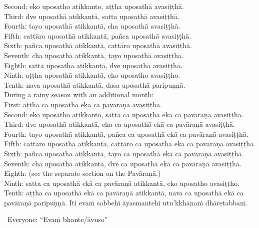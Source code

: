{{{{{					Second: eko uposatho atikkanto, aṭṭha uposathā avasiṭṭhā.\\
					Third: dve uposathā atikkantā, satta uposathā avasiṭṭhā.\\
					Fourth: tayo uposathā atikkantā, cha uposathā avasiṭṭhā.\\
					Fifth: cattāro uposathā atikkantā, pañca uposathā avasiṭṭhā.\\
					Sixth: pañca uposathā atikkantā, cattāro uposathā avasiṭṭhā.\\
					Seventh: cha uposathā atikkantā, tayo uposathā avasiṭṭhā.\\
					Eighth: satta uposathā atikkantā, dve uposathā avasiṭṭhā.\\
					Ninth: aṭṭha uposathā atikkantā, eko uposatho avasiṭṭho.\\
					\smallskip
					Tenth: nava uposathā atikkantā, dasa uposathā paripuṇṇā.\\
					During a rainy season with an additional month:\\
					First: aṭṭha ca uposathā ekā ca pavāraṇā avasiṭṭhā.\\
					Second: eko uposatho atikkanto, satta ca uposathā ekā ca pavāraṇā avasiṭṭhā.\\
					Third: dve uposathā atikkantā, cha ca uposathā ekā ca pavāraṇā avasiṭṭhā.\\
					Fourth: tayo uposathā atikkantā, pañca ca uposathā ekā ca pavāraṇā avasiṭṭhā.\\
					Fifth: cattāro uposathā atikkantā, cattāro ca uposathā ekā ca pavāraṇā avasiṭṭhā.\\
					Sixth: pañca uposathā atikkantā, tayo ca uposathā ekā ca pavāraṇā avasiṭṭhā.\\
					Seventh: cha uposathā atikkantā, dve ca uposathā ekā ca pavāraṇā avasiṭṭhā.\\
					Eighth: (see the separate section on the Pavāraṇā.)\\
					Ninth: satta ca uposathā ekā ca pavāraṇā atikkantā, eko uposatho avasiṭṭho.\\
					Tenth: aṭṭha ca uposathā ekā ca pavāraṇā atikkantā, nava ca uposathā ekā ca pavāraṇā paripuṇṇā.}}}}}\makeatother \thickspace
Iti evaṁ sabbehi āyasmantehi utu'kkhānaṁ dhāretabbaṁ.

\begin{center}
	\anglebracketleft\ \hspace{-0.5mm}Everyone: ``Evaṁ bhante/āvuso'' \hspace{-0.5mm}\anglebracketright\
\end{center}

